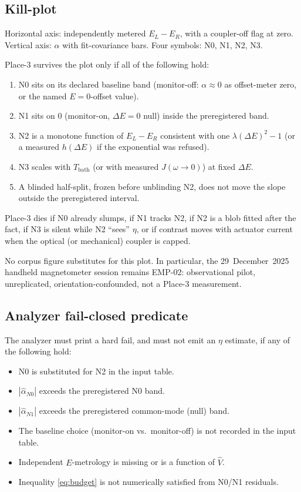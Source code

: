 \documentclass[11pt]{article}
\theoremstyle{definition}
\theoremstyle{plain}
\begin{document}
\subsection{Kill-plot}

Horizontal axis: independently metered $E_L - E_R$, with a coupler-off flag at zero. Vertical axis:
$\hat\alpha$ with fit-covariance bars. Four symbols: N0, N1, N2, N3.

Place-3 survives the plot only if all of the following hold:
\begin{enumerate}
\item N0 sits on its declared baseline band (monitor-off: $\alpha\approx0$ as offset-meter zero, or the named $E{=}0$-offset value).
\item N1 sits on $0$ (monitor-on, $\Delta E = 0$ null) inside the preregistered band.
\item N2 is a monotone function of $E_L - E_R$ consistent with one $\lambda(\Delta E)^2 - 1$ (or a measured $h(\Delta E)$ if the exponential was refused).
\item N3 scales with $T_{\mathrm{bath}}$ (or with measured $J(\omega\to0)$) at fixed $\Delta E$.
\item A blinded half-split, frozen before unblinding N2, does not move the slope outside the preregistered interval.
\end{enumerate}

Place-3 dies if N0 already slumps, if N1 tracks N2, if N2 is a blob fitted after the fact, if N3 is
silent while N2 ``sees'' $\eta$, or if contrast moves with actuator current when the optical (or
mechanical) coupler is capped.

No corpus figure substitutes for this plot. In particular, the 29~December~2025 handheld
magnetometer session remains EMP-02: observational pilot, unreplicated, orientation-confounded,
not a Place-3 measurement.\cite{ToE}

\subsection{Analyzer fail-closed predicate}

The analyzer must print a hard fail, and must not emit an $\eta$ estimate, if any of the following
hold:
\begin{itemize}
\item N0 is substituted for N2 in the input table.
\item $|\hat\alpha_{N0}|$ exceeds the preregistered N0 band.
\item $|\hat\alpha_{N1}|$ exceeds the preregistered common-mode (null) band.
\item The baseline choice (monitor-on vs.\ monitor-off) is not recorded in the input table.
\item Independent $E$-metrology is missing or is a function of $\hat V$.
\item Inequality \eqref{eq:budget} is not numerically satisfied from N0/N1 residuals.
\end{itemize}
\end{document}
